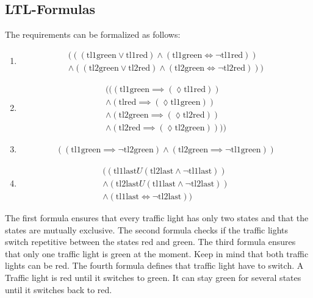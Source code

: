 \documentclass[12pt,a4paper,twoside]{article}
\begin{document}
\subsection{LTL-Formulas}
\label{sec:exampleltl}

The requirements can be formalized as follows:

\begin{enumerate}
\item 
  \begin{multline}
    (((\text{tl1green} \lor \text{tl1red}) \land (\text{tl1green}\iff \neg \text{tl1red})) \\ \land((\text{tl2green} \lor \text{tl2red})\land (\text{tl2green} \iff \neg \text{tl2red})))
  \end{multline}
\item
  \begin{multline}
    \label{eq:ltlreq1}
    (((\text{tl1green} \implies (\lozenge \text{tl1red})) \\
    \land (\text{tlred} \implies (\lozenge \text{tl1green}))\\
    \land (\text{tl2green} \implies (\lozenge \text{tl2red})) \\
    \land (\text{tl2red} \implies (\lozenge \text{tl2green}))))
  \end{multline}
\item
  \begin{multline}
    \label{eq:ltlreq2}
    ((\text{tl1green} \implies \neg \text{tl2green}) \land (\text{tl2green} \implies \neg \text{tl1green}))
  \end{multline}
\item
  \begin{multline}
    \label{eq:ltlreq3}
    ((\text{tl1last} U(\text{tl2last} \land \neg \text{tl1last})) \\
    \land (\text{tl2last} U (\text{tl1last} \land \neg \text{tl2last}))\\
\land(\text{tl1last} \iff \neg \text{tl2last}))
  \end{multline}
\end{enumerate}

The first formula ensures that every traffic light has only two states and that the states are mutually exclusive. The second formula checks if the traffic lights switch repetitive between the states red and green. The third formula ensures that only one traffic light is green at the moment. Keep in mind that both traffic lights can be red. The fourth formula defines that traffic light have to switch. A Traffic light is red until it switches to green. It can stay green for several states until it switches back to red.
\end{document}

